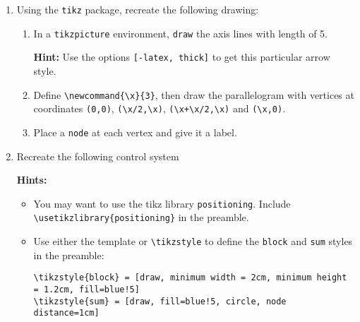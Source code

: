 \begin{enumerate}
    \item Using the \texttt{tikz} package, recreate the following drawing:
    \begin{figure}[h]\centering
        \newcommand{\x}{3}
    \end{figure}
    \begin{enumerate}
        \item In a \texttt{tikzpicture} environment, \texttt{draw} the axis lines with length of 5.
        
        \textbf{Hint:} Use the options \texttt{[-latex, thick]} to get this particular arrow style.
        \item Define \verb|\newcommand{\x}{3}|, then draw the parallelogram with vertices at coordinates \verb|(0,0)|, \verb|(\x/2,\x)|, \verb|(\x+\x/2,\x)| and \verb|(\x,0)|.
        \item Place a \texttt{node} at each vertex and give it a label.    
    \end{enumerate}
    \item Recreate the following control system
    \begin{figure}[h]\centering
    \end{figure}

\textbf{Hints:} \begin{itemize}
    \item You may want to use the tikz library \texttt{positioning}. Include \verb|\usetikzlibrary{positioning}| in the preamble.
    \item Use either the template or \verb|\tikzstyle| to define the \texttt{block} and \texttt{sum} styles in the preamble:
    \begin{lstlisting}
\tikzstyle{block} = [draw, minimum width = 2cm, minimum height = 1.2cm, fill=blue!5]
\tikzstyle{sum} = [draw, fill=blue!5, circle, node distance=1cm]
    \end{lstlisting}
\end{itemize}
\end{enumerate}
